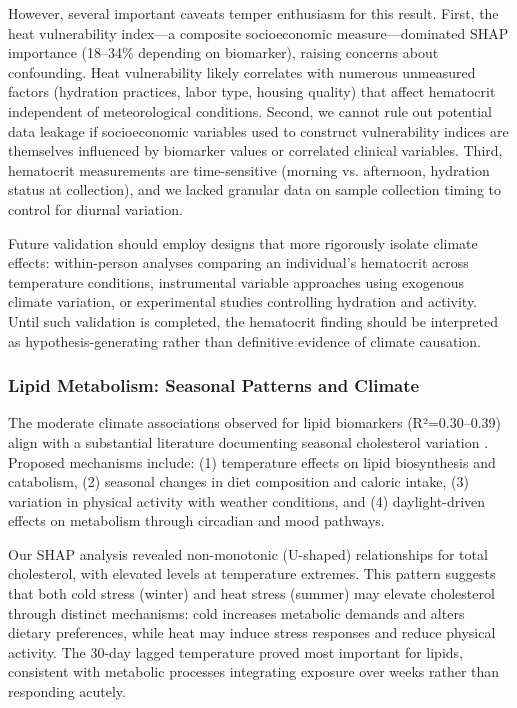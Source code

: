However, several important caveats temper enthusiasm for this result. First, the heat vulnerability index---a composite socioeconomic measure---dominated SHAP importance (18--34\% depending on biomarker), raising concerns about confounding. Heat vulnerability likely correlates with numerous unmeasured factors (hydration practices, labor type, housing quality) that affect hematocrit independent of meteorological conditions. Second, we cannot rule out potential data leakage if socioeconomic variables used to construct vulnerability indices are themselves influenced by biomarker values or correlated clinical variables. Third, hematocrit measurements are time-sensitive (morning vs. afternoon, hydration status at collection), and we lacked granular data on sample collection timing to control for diurnal variation.

Future validation should employ designs that more rigorously isolate climate effects: within-person analyses comparing an individual's hematocrit across temperature conditions, instrumental variable approaches using exogenous climate variation, or experimental studies controlling hydration and activity. Until such validation is completed, the hematocrit finding should be interpreted as hypothesis-generating rather than definitive evidence of climate causation.

\subsubsection{Lipid Metabolism: Seasonal Patterns and Climate}

The moderate climate associations observed for lipid biomarkers (R²=0.30--0.39) align with a substantial literature documenting seasonal cholesterol variation \citep{ockene1990seasonal}. Proposed mechanisms include: (1) temperature effects on lipid biosynthesis and catabolism, (2) seasonal changes in diet composition and caloric intake, (3) variation in physical activity with weather conditions, and (4) daylight-driven effects on metabolism through circadian and mood pathways.

Our SHAP analysis revealed non-monotonic (U-shaped) relationships for total cholesterol, with elevated levels at temperature extremes. This pattern suggests that both cold stress (winter) and heat stress (summer) may elevate cholesterol through distinct mechanisms: cold increases metabolic demands and alters dietary preferences, while heat may induce stress responses and reduce physical activity. The 30-day lagged temperature proved most important for lipids, consistent with metabolic processes integrating exposure over weeks rather than responding acutely.

